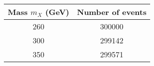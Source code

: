 \begin{tabular}{|c|c|}
\hline
Mass $m_X$ (GeV) & Number of events \\ \hline
260 & 300000\\
300 & 299142\\
350 & 299571\\
\hline
\end{tabular}
